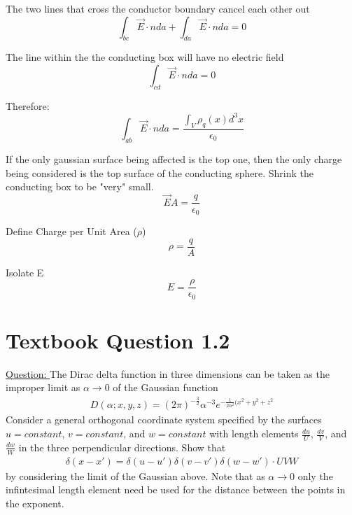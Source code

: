 \documentclass[English]{article}
\begin{document}
    The two lines that cross the conductor boundary cancel each other out
    \begin{equation} \label{eq: 1-10}
        \int_{bc} \vec{E} \cdot n da + \int_{da} \vec{E} \cdot n da = 0
    \end{equation}

    The line within the the conducting box will have no electric field
    \begin{equation} \label{eq: 1-11}
        \int_{cd} \vec{E} \cdot n da = 0
    \end{equation}

    Therefore:
    \begin{equation} \label{eq: 1-12}
        \int_{ab} \vec{E} \cdot n da = \frac{\int_V \rho_q(x) d^3 x}{\epsilon_0}
    \end{equation}

    If the only gaussian surface being affected is the top one, then the only charge being considered is the top surface of the conducting sphere. Shrink the conducting box to be "very" small. 
    \begin{equation} \label{eq: 1-13}
        \vec{E} A = \frac{q}{\epsilon_0}
    \end{equation}

    Define Charge per Unit Area ($\rho$)
    \begin{equation} \label{eq: 1-14}
        \rho = \frac{q}{A}
    \end{equation}

    Isolate E
    \begin{equation} \label{eq: 1-15}
        E = \frac{\rho}{\epsilon_0}
    \end{equation}

\newpage
\section{Textbook Question 1.2} \label{section2}
    \underline{Question: }
    \newline The Dirac delta function in three dimensions can be taken as the improper limit as $\alpha \rightarrow 0$ of the Gaussian function
    \begin{gather*}
        D(\alpha; x, y, z) = (2 \pi)^{-\frac{3}{2}} \alpha^{-3} e^{-\frac{1}{2 \alpha^2} (x^2 + y^2 + z^2}
    \end{gather*}
    Consider a general orthogonal coordinate system specified by the surfaces $u = constant$, $v = constant$, and $w = constant$ with length elements $\frac{du}{U}$, $\frac{dv}{V}$, and $\frac{dw}{W}$ in the three perpendicular directions. Show that
    \begin{gather*}
        \delta(x-x') = \delta(u-u') \delta(v-v') \delta(w-w') \cdot UVW
    \end{gather*}
    by considering the limit of the Gaussian above. Note that as $\alpha \rightarrow 0$ only the infintesimal length element need be used for the distance between the points in the exponent.
\end{document}

